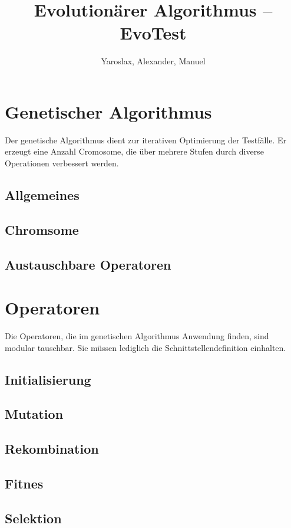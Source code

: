 \documentclass[12pt,a4paper]{scrartcl}
\title{Evolutionärer Algorithmus -- EvoTest}
\author{Yaroslax, Alexander, Manuel}
\begin{document}
\section{Genetischer Algorithmus}
Der genetische Algorithmus dient zur iterativen Optimierung der Testfälle. Er erzeugt eine Anzahl Cromosome, die über mehrere Stufen durch diverse Operationen verbessert werden.

\subsection{Allgemeines}

\subsection{Chromsome}

\subsection{Austauschbare Operatoren}

\section{Operatoren}
Die Operatoren, die im genetischen Algorithmus Anwendung finden, sind modular tauschbar. Sie müssen lediglich die Schnittstellendefinition einhalten.
\subsection{Initialisierung}

\subsection{Mutation}

\subsection{Rekombination}

\subsection{Fitnes}

\subsection{Selektion}
\end{document}

